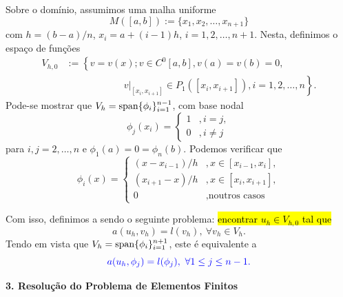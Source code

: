 Sobre o domínio, assumimos uma malha uniforme
\begin{equation}
  M([a,b]) := \{x_1, x_2, \dotsc, x_{n+1}\}
\end{equation}
com $h = (b-a)/n$, $x_i = a + (i-1)h$, $i=1, 2, \dotsc, n+1$. Nesta, definimos o espaço de funções
\begin{equation}
  \begin{aligned}
    V_{h,0} &:= \left\{v=v(x); v\in C^0[a,b], v(a)=v(b)=0, \right.\\
    &\left.\qquad\qquad\qquad v|_{[x_i,x_{i+1}]}\in P_1([x_i,x_{i+1}]), i=1, 2, \dotsc, n\right\}.
  \end{aligned}
\end{equation}
Pode-se mostrar que $V_h = \operatorname{span}\{\phi_i\}_{i=1}^{n-1}$, com base nodal
\begin{equation}
  \phi_j(x_i) = \left\{
    \begin{array}{ll}
      1 &, i=j,\\
      0 &, i\neq j
    \end{array}
\right.
\end{equation}
para $i,j = 2, \dotsc, n$ e $\phi_1(a)=0=\phi_n(b)$. Podemos verificar que
\begin{equation}
  \phi_i(x) = \left\{
    \begin{array}{ll}
      (x-x_{i-1})/h &, x\in [x_{i-1}, x_i],\\
      (x_{i+1}-x)/h &, x\in [x_i, x_{i+1}],\\
      0 &, \text{noutros casos}
    \end{array}
\right.
\end{equation}

Com isso, definimos a  sendo o seguinte problema: \hl{encontrar $u_h\in V_{h,0}$ tal que}
\begin{equation}
  a(u_h, v_h) = l(v_h), ~\forall v_h\in V_h.
\end{equation}
Tendo em vista que $V_h = \operatorname{span}\{\phi_i\}_{i=1}^{n+1}$, este é equivalente a
\begin{equation}\label{cap_pvc_sec_mef:eq:fef}\color{blue}a(u_h, \phi_j) = l(\phi_j), ~\forall 1\leq j \leq n-1.
\end{equation}

\begin{flushleft}
  \textbf{3. Resolução do Problema de Elementos Finitos}
\end{flushleft}

